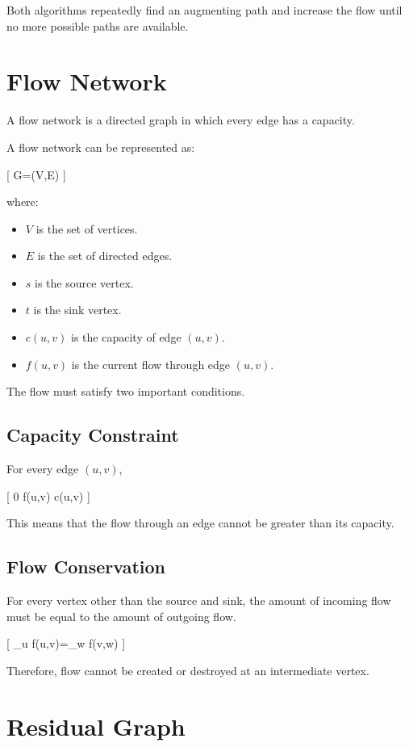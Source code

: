 \documentclass[12pt,a4paper]{article}
\begin{document}
Both algorithms repeatedly find an augmenting path and increase the
flow until no more possible paths are available.

\section{Flow Network}

A flow network is a directed graph in which every edge has a capacity.

A flow network can be represented as:

[
G=(V,E)
]

where:

\begin{itemize}
\item $V$ is the set of vertices.
\item $E$ is the set of directed edges.
\item $s$ is the source vertex.
\item $t$ is the sink vertex.
\item $c(u,v)$ is the capacity of edge $(u,v)$.
\item $f(u,v)$ is the current flow through edge $(u,v)$.
\end{itemize}

The flow must satisfy two important conditions.

\subsection{Capacity Constraint}

For every edge $(u,v)$,

[
0 \leq f(u,v) \leq c(u,v)
]

This means that the flow through an edge cannot be greater than its
capacity.

\subsection{Flow Conservation}

For every vertex other than the source and sink, the amount of incoming
flow must be equal to the amount of outgoing flow.

[
\sum\_{u} f(u,v)=\sum\_{w} f(v,w)
]

Therefore, flow cannot be created or destroyed at an intermediate
vertex.

\section{Residual Graph}
\end{document}
